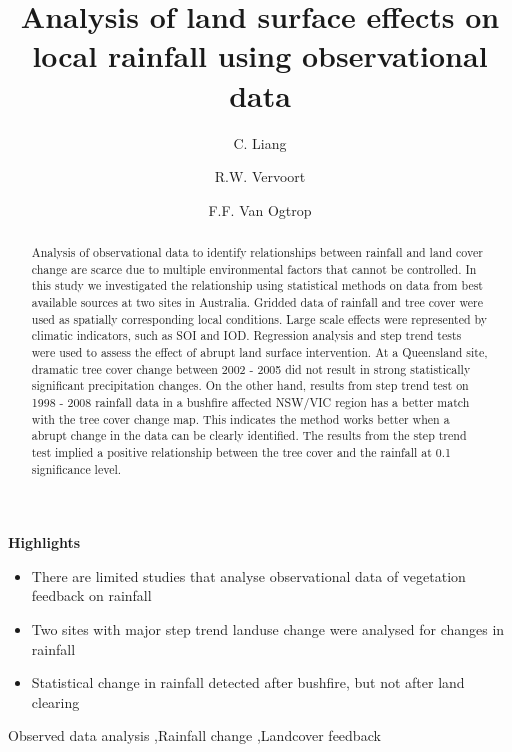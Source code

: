 \documentclass[authoryear,preprint,review,12pt]{elsarticle}
\begin{document}


\textbf{Highlights} 
\begin{itemize}
\item There are limited studies that analyse observational data of vegetation feedback on rainfall
\item Two sites with major step trend landuse change were analysed for changes in rainfall
\item Statistical change in rainfall detected after bushfire, but not after land clearing
\end{itemize}



\begin{frontmatter}

\title{Analysis of land surface effects on local rainfall using observational data}

\author{C. Liang}
\author{R.W. Vervoort }
\author{F.F. Van Ogtrop}


\address{Sydney Institute of Agriculture, School of Life and Environmental Sciences, The University of Sydney}
\cortext[cor1]{}



\begin{abstract}
Analysis of observational data to identify relationships between rainfall and land cover change are scarce due to multiple environmental factors that cannot be controlled. In this study we investigated the relationship using statistical methods on data from best available sources at two sites in Australia. Gridded data of rainfall and tree cover were used as spatially corresponding local conditions. Large scale effects were represented by climatic indicators, such as SOI and IOD. Regression analysis and step trend tests were used to assess the effect of abrupt land surface intervention. At a Queensland site, dramatic tree cover change between 2002 - 2005 did not result in strong statistically significant precipitation changes. On the other hand, results from step trend test on 1998 - 2008 rainfall data in a bushfire affected NSW/VIC region has a better match with the tree cover change map. This indicates the method works better when a abrupt change in the data can be clearly identified. The results from the step trend test implied a positive relationship between the tree cover and the rainfall at 0.1 significance level. 
\end{abstract}

\begin{keyword}
Observed data analysis \sep Rainfall change \sep Landcover feedback
\end{keyword}

\end{frontmatter}
\end{document}
